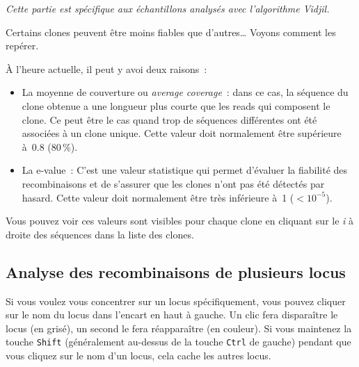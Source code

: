\documentclass[11pt]{article}
\begin{document}
\bigskip

\textit{Cette partie est spécifique aux échantillons analysés avec
l'algorithme Vidjil.}

Certains clones peuvent être moins fiables que d'autres\ldots{} Voyons
comment les repérer.

À l'heure actuelle, il peut y avoi deux raisons~:
\begin{itemize}
\item
  La moyenne de couverture ou \textit{average coverage}~: dans ce cas, la
  séquence du clone obtenue a une longueur plus courte que les reads qui
  composent le clone. Ce peut être le cas quand trop de séquences
  différentes ont été associées à un clone unique. Cette valeur doit
  normalement être supérieure à~0.8 (80\,\%).
\item
  La e-value~: C'est une valeur statistique qui permet d'évaluer la
  fiabilité des recombinaisons et de s'assurer que les clones n'ont pas été détectés
  par hasard. Cette valeur doit normalement être très
  inférieure à~1 ($<10^{-5}$).
\end{itemize}

Vous pouvez voir ces valeurs sont visibles pour chaque clone en cliquant
sur le \textit{i} à droite des séquences dans la liste des clones.

\subsection{Analyse des recombinaisons de plusieurs locus}

Si vous voulez vous concentrer sur un locus spécifiquement, vous pouvez
cliquer sur le nom du locus dans l'encart en haut à gauche. Un clic fera
disparaître le locus (en grisé), un second le fera réapparaître (en
couleur). Si vous maintenez la touche \texttt{Shift} (généralement au-dessus de
la touche \texttt{Ctrl} de gauche) pendant que vous cliquez sur le nom d'un
locus, cela cache les autres locus.

\end{document}

